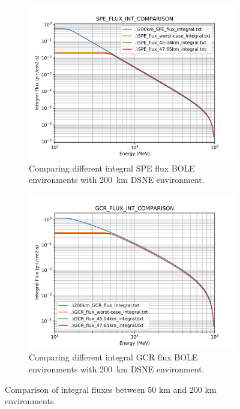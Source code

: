 \documentclass{hitec}
\begin{document}
\begin{figure}[htbp!]
	\centering
	\begin{subfigure}[b]{0.65\textwidth}
		\centering
		\includegraphics[width=\textwidth]{SPE_FLUX_INT_COMPARISON.png}
		\caption{Comparing different integral SPE flux BOLE environments with 200~km DSNE environment.}
		\label{sfig:SPE_FLUX_INT_COMPARISON}
	\end{subfigure}
	\hfill
	\begin{subfigure}[b]{0.65\textwidth}
		\centering
		\includegraphics[width=\textwidth]{GCR_FLUX_INT_COMPARISON.png}
		\caption{Comparing different integral GCR flux BOLE environments with 200~km DSNE environment.}
		\label{sfig:GCR_FLUX_INT_COMPARISON}
	\end{subfigure}
	\caption{Comparison of integral fluxes between 50 km and 200 km environments.}
	\label{fig:FLUX_INT_COMPARISON}
\end{figure}
\end{document}
